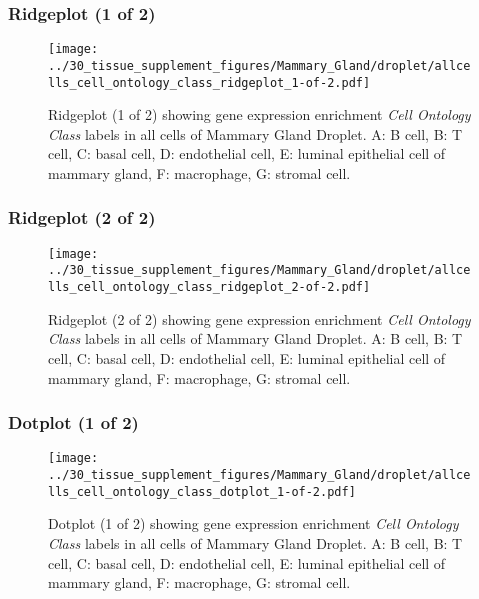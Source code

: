 \clearpage

\subsubsection{Ridgeplot (1 of 2)}
\begin{figure}[h]
\centering
\texttt{[image: ../30\_tissue\_supplement\_figures/Mammary\_Gland/droplet/allcells\_cell\_ontology\_class\_ridgeplot\_1-of-2.pdf]}

\caption{ Ridgeplot (1 of 2)  showing gene expression enrichment \emph{Cell Ontology Class} labels in all cells of Mammary Gland Droplet. A: B cell, B: T cell, C: basal cell, D: endothelial cell, E: luminal epithelial cell of mammary gland, F: macrophage, G: stromal cell.}
\end{figure}


\clearpage

\subsubsection{Ridgeplot (2 of 2)}
\begin{figure}[h]
\centering
\texttt{[image: ../30\_tissue\_supplement\_figures/Mammary\_Gland/droplet/allcells\_cell\_ontology\_class\_ridgeplot\_2-of-2.pdf]}

\caption{ Ridgeplot (2 of 2)  showing gene expression enrichment \emph{Cell Ontology Class} labels in all cells of Mammary Gland Droplet. A: B cell, B: T cell, C: basal cell, D: endothelial cell, E: luminal epithelial cell of mammary gland, F: macrophage, G: stromal cell.}
\end{figure}


\clearpage

\subsubsection{Dotplot (1 of 2)}
\begin{figure}[h]
\centering
\texttt{[image: ../30\_tissue\_supplement\_figures/Mammary\_Gland/droplet/allcells\_cell\_ontology\_class\_dotplot\_1-of-2.pdf]}

\caption{ Dotplot (1 of 2)  showing gene expression enrichment \emph{Cell Ontology Class} labels in all cells of Mammary Gland Droplet. A: B cell, B: T cell, C: basal cell, D: endothelial cell, E: luminal epithelial cell of mammary gland, F: macrophage, G: stromal cell.}
\end{figure}


